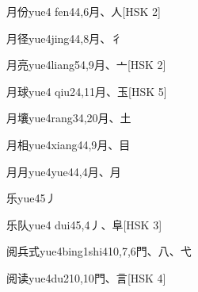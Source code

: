 \begin{entry}{月份}{yue4 fen4}{4,6}{⽉、⼈}[HSK 2]
\end{entry}

\begin{entry}{月径}{yue4jing4}{4,8}{⽉、⼻}
\end{entry}

\begin{entry}{月亮}{yue4liang5}{4,9}{⽉、⼇}[HSK 2]
\end{entry}

\begin{entry}{月球}{yue4 qiu2}{4,11}{⽉、⽟}[HSK 5]
\end{entry}

\begin{entry}{月壤}{yue4rang3}{4,20}{⽉、⼟}
\end{entry}

\begin{entry}{月相}{yue4xiang4}{4,9}{⽉、⽬}
\end{entry}

\begin{entry}{月月}{yue4yue4}{4,4}{⽉、⽉}
\end{entry}

\begin{entry}{乐}{yue4}{5}{⼃}
\end{entry}

\begin{entry}{乐队}{yue4 dui4}{5,4}{⼃、⾩}[HSK 3]
\end{entry}

\begin{entry}{阅兵式}{yue4bing1shi4}{10,7,6}{⾨、⼋、⼷}
\end{entry}

\begin{entry}{阅读}{yue4du2}{10,10}{⾨、⾔}[HSK 4]
\end{entry}

